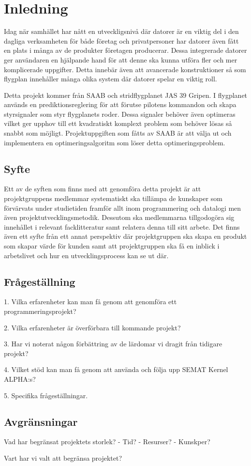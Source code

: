 \section{Inledning}
Idag när samhället har nått en utveckligsnivå där datorer är en viktig del i den dagliga verksamheten för både företag och privatpersoner har datorer även fått en plats i många av de produkter företagen producerar. Dessa integrerade datorer ger användaren en hjälpande hand för att denne ska kunna utföra fler och mer komplicerade uppgifter. Detta innebär även att avancerade konstruktioner så som flygplan innehåller många olika system där datorer spelar en viktig roll.

Detta projekt kommer från SAAB och stridflygplanet JAS 39 Gripen. I flygplanet används en prediktionsreglering för att förutse pilotens kommandon och skapa styrsignaler som styr flygplanets roder. Dessa signaler behöver även optimeras vilket ger upphov till ett kvadratiskt komplext problem som behöver lösas så snabbt som möjligt. Projektuppgiften som fåtts av SAAB är att välja ut och implementera en optimeringsalgoritm som löser detta optimeringsproblem.

\subsection{Syfte}
Ett av de syften som finns med att genomföra detta projekt är att projektgruppens medlemmar systematiskt ska tillämpa de kunskaper som förvärvats under studietiden framför allt inom programmering och datalogi men även projektutvecklingsmetodik. Dessutom ska medlemmarna tillgodogöra sig innehållet i relevant facklitteratur samt relatera denna till sitt arbete. 
Det finns även ett syfte från ett annat perspektiv där projektgruppen ska skapa en produkt som skapar värde för kunden samt att projektgruppen ska få en inblick i arbetslivet och hur en utvecklingsprocess kan se ut där.

\subsection{Frågeställning}
1. Vilka erfarenheter kan man få genom att genomföra ett programmeringsprojekt?
	
2. Vilka erfarenheter är överförbara till kommande projekt?

3. Har vi noterat någon förbättring av de lärdomar vi dragit från tidigare projekt?

4. Vilket stöd kan man få genom att använda och följa upp SEMAT Kernel ALPHA:s?

5. Specifika frågeställningar.

\subsection{Avgränsningar}
Vad har begränsat projektets storlek?
- Tid?
- Resurser?
- Kunskper?

Vart har vi valt att begränsa projektet?